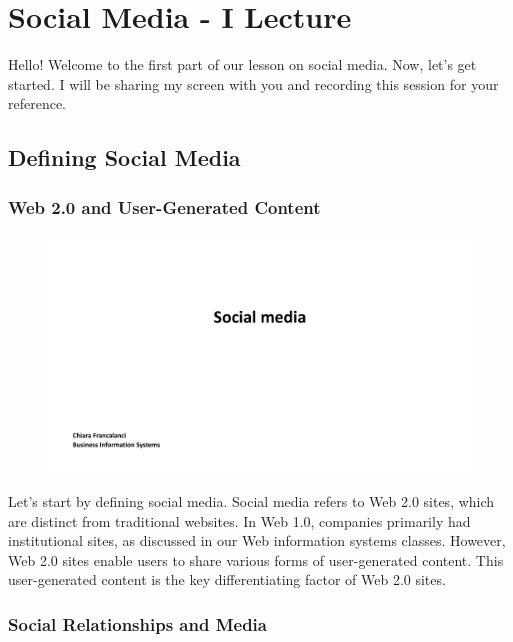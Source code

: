 \section{Social Media - I Lecture}

Hello! Welcome to the first part of our lesson on social media.
Now, let's get started. I will be sharing my screen with you and
recording this session for your reference.

\subsection{Defining Social Media}\label{defining-social-media}

\subsubsection{Web 2.0 and User-Generated
    Content}\label{web-2.0-and-user-generated-content}

\begin{figure}[!h]
    \centering
    \includegraphics[page=2, trim = 1.5cm 7cm 3cm 4cm, clip, width=\textwidth]{images/04 - Social_Media.pdf}
\end{figure}

Let's start by defining social media. Social media refers to Web 2.0
sites, which are distinct from traditional websites. In Web 1.0,
companies primarily had institutional sites, as discussed in our Web
information systems classes. However, Web 2.0 sites enable users to
share various forms of user-generated content. This user-generated
content is the key differentiating factor of Web 2.0 sites.

\subsubsection{Social Relationships and
    Media}\label{social-relationships-and-media}

